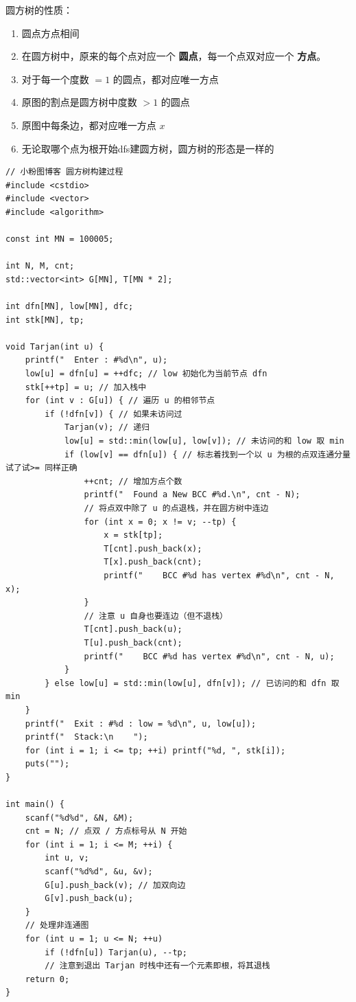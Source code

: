 \par \noindent 圆方树的性质：
\begin{enumerate}
\item 圆点方点相间
\item 在圆方树中，原来的每个点对应一个 \textbf{圆点}，每一个点双对应一个 \textbf{方点}。
\item 对于每一个度数 $=1$ 的圆点，都对应唯一方点
\item 原图的割点是圆方树中度数 $>1$ 的圆点
\item 原图中每条边，都对应唯一方点 $x$
\item 无论取哪个点为根开始dfs建圆方树，圆方树的形态是一样的
\end{enumerate}
\begin{verbatim}
// 小粉图博客 圆方树构建过程
#include <cstdio>
#include <vector>
#include <algorithm>

const int MN = 100005;

int N, M, cnt;
std::vector<int> G[MN], T[MN * 2];

int dfn[MN], low[MN], dfc;
int stk[MN], tp;

void Tarjan(int u) {
    printf("  Enter : #%d\n", u);
    low[u] = dfn[u] = ++dfc; // low 初始化为当前节点 dfn
    stk[++tp] = u; // 加入栈中
    for (int v : G[u]) { // 遍历 u 的相邻节点
        if (!dfn[v]) { // 如果未访问过
            Tarjan(v); // 递归
            low[u] = std::min(low[u], low[v]); // 未访问的和 low 取 min
            if (low[v] == dfn[u]) { // 标志着找到一个以 u 为根的点双连通分量 试了试>= 同样正确
                ++cnt; // 增加方点个数
                printf("  Found a New BCC #%d.\n", cnt - N);
                // 将点双中除了 u 的点退栈，并在圆方树中连边
                for (int x = 0; x != v; --tp) {
                    x = stk[tp];
                    T[cnt].push_back(x);
                    T[x].push_back(cnt);
                    printf("    BCC #%d has vertex #%d\n", cnt - N, x);
                }
                // 注意 u 自身也要连边（但不退栈）
                T[cnt].push_back(u);
                T[u].push_back(cnt);
                printf("    BCC #%d has vertex #%d\n", cnt - N, u);
            }
        } else low[u] = std::min(low[u], dfn[v]); // 已访问的和 dfn 取 min
    }
    printf("  Exit : #%d : low = %d\n", u, low[u]);
    printf("  Stack:\n    ");
    for (int i = 1; i <= tp; ++i) printf("%d, ", stk[i]);
    puts("");
}

int main() {
    scanf("%d%d", &N, &M);
    cnt = N; // 点双 / 方点标号从 N 开始
    for (int i = 1; i <= M; ++i) {
        int u, v;
        scanf("%d%d", &u, &v);
        G[u].push_back(v); // 加双向边
        G[v].push_back(u);
    }
    // 处理非连通图
    for (int u = 1; u <= N; ++u)
        if (!dfn[u]) Tarjan(u), --tp;
        // 注意到退出 Tarjan 时栈中还有一个元素即根，将其退栈
    return 0;
}
\end{verbatim}

